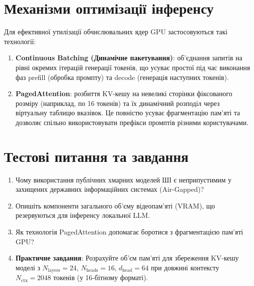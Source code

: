 \section{Механізми оптимізації інференсу}
Для ефективної утилізації обчислювальних ядер GPU застосовуються такі технології:
\begin{enumerate}
    \item \textbf{Continuous Batching (Динамічне пакетування)}: об'єднання запитів на рівні окремих ітерацій генерації токенів, що усуває простої під час виконання фаз prefill (обробка промпту) та decode (генерація наступних токенів).
    \item \textbf{PagedAttention}: розбиття KV-кешу на невеликі сторінки фіксованого розміру (наприклад, по 16 токенів) та їх динамічний розподіл через віртуальну таблицю вказівок. Це повністю усуває фрагментацію пам'яті та дозволяє спільно використовувати префікси промптів різними користувачами.
\end{enumerate}

\section{Тестові питання та завдання}
\begin{enumerate}
    \item Чому використання публічних хмарних моделей ШІ є неприпустимим у захищених державних інформаційних системах (Air-Gapped)?
    \item Опишіть компоненти загального об'єму відеопам'яті (VRAM), що резервуються для інференсу локальної LLM.
    \item Як технологія PagedAttention допомагає боротися з фрагментацією пам'яті GPU?
    \item \textbf{Практичне завдання}: Розрахуйте об'єм пам'яті для збереження KV-кешу моделі з $N_{\text{layers}} = 24$, $N_{\text{heads}} = 16$, $d_{\text{head}} = 64$ при довжині контексту $N_{\text{ctx}} = 2048$ токенів (у 16-бітному форматі).
\end{enumerate}
